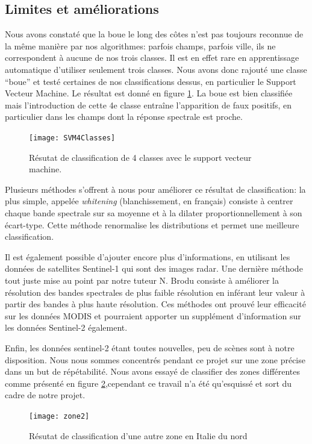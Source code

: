 \documentclass[a4paper,10pt]{report}
\begin{document}
\subsection{Limites et améliorations}
Nous avons constaté que la boue le long des côtes n'est pas toujours reconnue de la même manière par nos algorithmes: parfois champs, parfois ville, ils ne correspondent à aucune de nos trois classes. Il est en effet rare en apprentissage automatique d'utiliser seulement trois classes. Nous avons donc rajouté une classe ``boue'' et testé certaines de nos classifications dessus, en particulier le Support Vecteur Machine. Le résultat est donné en figure \ref{fig:SVM4Cl}. La boue est bien classifiée mais l'introduction de cette 4e classe entraîne l'apparition de faux positifs, en particulier dans les champs dont la réponse spectrale est proche.
\begin{figure}
  \centering
    \texttt{[image: SVM4Classes]}
  \caption{Résutat de classification de 4 classes avec le support vecteur machine.}
  \label{fig:SVM4Cl}
\end{figure}

Plusieurs méthodes s'offrent à nous pour améliorer ce résultat de classification: la plus simple, appelée \textit{whitening} (blanchissement, en français) consiste à centrer chaque bande spectrale sur sa moyenne et à la dilater proportionnellement à son écart-type. Cette méthode renormalise les distributions et permet une meilleure classification.

Il est également possible d'ajouter encore plus d'informations, en utilisant les données de satellites Sentinel-1 qui sont des images radar. Une dernière méthode tout juste mise au point par notre tuteur N. Brodu consiste à améliorer la résolution des bandes spectrales de plus faible résolution en inférant leur valeur à partir des bandes à plus haute résolution. Ces méthodes ont prouvé leur efficacité sur les données MODIS et pourraient apporter un supplément d'information sur les données Sentinel-2 également.

Enfin, les données sentinel-2 étant toutes nouvelles, peu de scènes sont à notre disposition. Nous nous sommes concentrés pendant ce projet sur une zone précise dans un but de répétabilité. Nous avons essayé de classifier des zones différentes comme présenté en figure \ref{fig:zone2},cependant ce travail n'a été qu'esquissé et sort du cadre de notre projet.

\begin{figure}
  \centering
    \texttt{[image: zone2]}
  \caption{Résutat de classification d'une autre zone en Italie du nord}
  \label{fig:zone2}
\end{figure}




\end{document}
